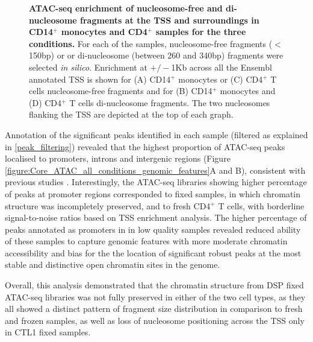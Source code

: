\begin{figure}[htbp]
\caption[ATAC-seq enrichment of nucleosome-free and di-nucleosome fragments at the TSS and surroundings in CD14$^+$ monocytes and CD4$^+$ samples for the three conditions.]{\textbf{ATAC-seq enrichment of nucleosome-free and di-nucleosome fragments at the TSS and surroundings in CD14$^+$ monocytes and CD4$^+$ samples for the three conditions.} For each of the samples, nucleosome-free fragments ($<$150bp) or or di-nucleosome (between 260 and 340bp) fragments were selected \textit{in silico}. Enrichment at $+/-$1Kb across all the Ensembl annotated TSS is shown for (A) CD14$^+$ monocytes or (C) CD4$^+$ T cells nucleosome-free fragments and for (B) CD14$^+$ monocytes and (D) CD4$^+$ T cells di-nucleosome fragments. The two nucleosomes flanking the TSS are depicted at the top of each graph.}
\label{figure:Core_ATAC_intra_dinucleosome_tss_enrichment}
\end{figure}



Annotation of the significant peaks identified in each sample (filtered as explained in \ref{peak_filtering}) revealed that the highest proportion of ATAC-seq peaks localised to promoters, introns and intergenic regions (Figure \ref{figure:Core_ATAC_all_conditions_genomic_features}A and B), consistent with previous studies \parencite{Buenrostro2013,Scharer2016}. Interestingly, the ATAC-seq libraries showing higher percentage of peaks at promoter regions corresponded to fixed samples, in which chromatin structure was incompletely preserved, and to fresh CD4$^+$ T cells, with borderline signal-to-noise ratios based on TSS enrichment analysis. The higher percentage of peaks annotated as promoters in in low quality samples revealed reduced ability of these samples to capture genomic features with more moderate chromatin accessibility and bias for the the location of significant robust peaks at the most stable and distinctive open chromatin sites in the genome.

Overall, this analysis demonstrated that the chromatin structure from DSP fixed ATAC-seq libraries was not fully preserved in either of the two cell types, as they all showed a distinct pattern of fragment size distribution in comparison to fresh and frozen samples, as well as loss of nucleosome positioning across the TSS only in CTL1 fixed samples. 

